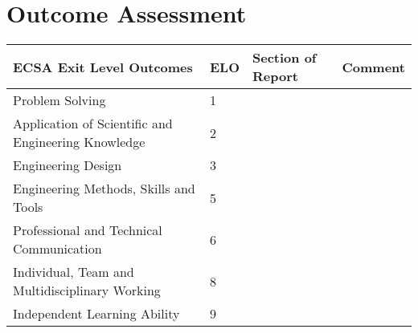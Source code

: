 \section{Outcome Assessment}
\begin{table}[]
	
	\hspace*{-1cm}\begin{tabular}{|l|l|l|l|}
		\hline
		ECSA Exit Level Outcomes 													& ELO & Section of Report & Comment   \\
		\hline
		Problem Solving 		 													&    1               &         &   \\
		\hline
		Application of Scientific and Engineering Knowledge							&    2              &         &    \\
		\hline
		Engineering Design															&    3              &         &   	\\
		\hline
		Engineering Methods, Skills and Tools 		 	& 	5& &  \\
		\hline
		Professional and Technical Communication									&	6 & &  \\
		\hline
		Individual, Team and Multidisciplinary Working								&	 8& &  \\
		\hline
		Independent Learning Ability												& 	9& &  \\
		\hline
	\end{tabular} \hspace*{-1cm}
\end{table}

